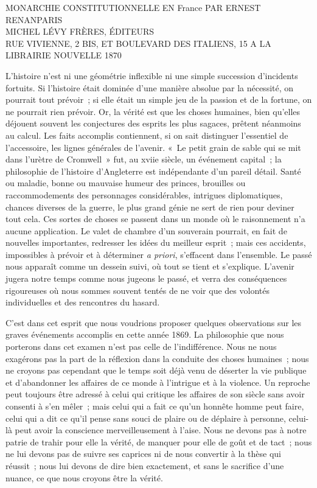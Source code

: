 \documentclass[french,twoside]{book} %
\begin{document}
  \frontmatter 
\begin{titlepage}
MONARCHIE CONSTITUTIONNELLE EN France PAR ERNEST RENANPARIS \\
MICHEL LÉVY FRÈRES, ÉDITEURS \\
RUE VIVIENNE, 2 BIS, ET BOULEVARD DES ITALIENS, 15 A LA LIBRAIRIE NOUVELLE 1870
\end{titlepage}
\mainmatter \noindent L’histoire n’est ni une géométrie inflexible ni une simple succession d’incidents fortuits. Si l’histoire était dominée d’une manière absolue par la nécessité, on pourrait tout prévoir ; si elle était un simple jeu de la passion et de la fortune, on ne pourrait rien prévoir. Or, la vérité est que les choses humaines, bien qu’elles déjouent souvent les conjectures des esprits les plus sagaces, prêtent néanmoins au calcul. Les faits accomplis contiennent, si on sait distinguer l’essentiel de l’accessoire, les lignes générales de l’avenir. « Le petit grain de sable qui se mit dans l’urètre de Cromwell » fut, au xviie siècle, un événement capital ; la philosophie de l’histoire d’Angleterre est indépendante d’un pareil détail. Santé ou maladie, bonne ou mauvaise humeur des princes, brouilles ou raccommodements des personnages considérables, intrigues diplomatiques, chances diverses de la guerre, le plus grand génie ne sert de rien pour deviner tout cela. Ces sortes de choses se passent dans un monde où le raisonnement n’a aucune application. Le valet de chambre d’un souverain pourrait, en fait de nouvelles importantes, redresser les idées du meilleur esprit ; mais ces accidents, impossibles à prévoir et à déterminer {\itshape a priori}, s’effacent dans l’ensemble. Le passé nous apparaît comme un dessein suivi, où tout se tient et s’explique. L’avenir jugera notre temps comme nous jugeons le passé, et verra des conséquences rigoureuses où nous sommes souvent tentés de ne voir que des volontés individuelles et des rencontres du hasard.\par
C’est dans cet esprit que nous voudrions proposer quelques observations sur les graves événements accomplis en cette année 1869. La philosophie que nous porterons dans cet examen n’est pas celle de l’indifférence. Nous ne nous exagérons pas la part de la réflexion dans la conduite des choses humaines ; nous ne croyons pas cependant que le temps soit déjà venu de déserter la vie publique et d’abandonner les affaires de ce monde à l’intrigue et à la violence. Un reproche peut toujours être adressé à celui qui critique les affaires de son siècle sans avoir consenti à s’en mêler ; mais celui qui a fait ce qu’un honnête homme peut faire, celui qui a dit ce qu’il pense sans souci de plaire ou de déplaire à personne, celui-là peut avoir la conscience merveilleusement à l’aise. Nous ne devons pas à notre patrie de trahir pour elle la vérité, de manquer pour elle de goût et de tact ; nous ne lui devons pas de suivre ses caprices ni de nous convertir à la thèse qui réussit ; nous lui devons de dire bien exactement, et sans le sacrifice d’une nuance, ce que nous croyons être la vérité.
\end{document}
